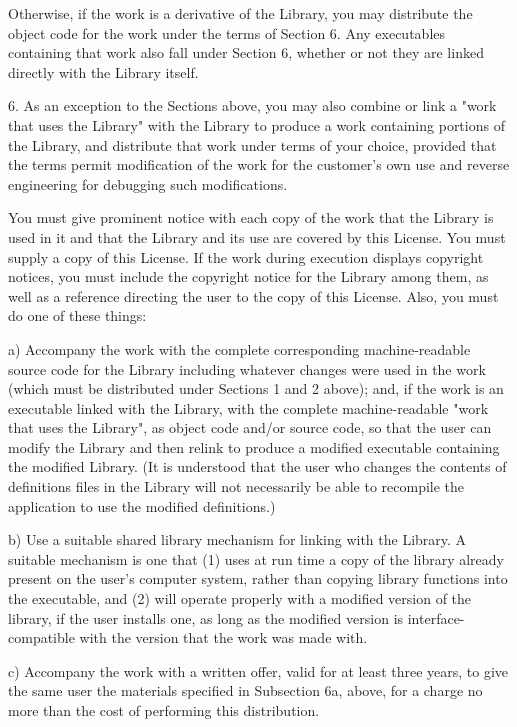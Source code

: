Otherwise, if the work is a derivative of the Library, you may distribute the object code for the work under the terms of Section 6. Any executables containing that work also fall under Section 6, whether or not they are linked directly with the Library itself.

6. As an exception to the Sections above, you may also combine or link a "work that uses the Library" with the Library to produce a work containing portions of the Library, and distribute that work under terms of your choice, provided that the terms permit modification of the work for the customer's own use and reverse engineering for debugging such modifications.

You must give prominent notice with each copy of the work that the Library is used in it and that the Library and its use are covered by this License. You must supply a copy of this License. If the work during execution displays copyright notices, you must include the copyright notice for the Library among them, as well as a reference directing the user to the copy of this License. Also, you must do one of these things:

a) Accompany the work with the complete corresponding machine-readable source code for the Library including whatever changes were used in the work (which must be distributed under Sections 1 and 2 above); and, if the work is an executable linked with the Library, with the complete machine-readable "work that uses the Library", as object code and/or source code, so that the user can modify the Library and then relink to produce a modified executable containing the modified Library. (It is understood that the user who changes the contents of definitions files in the Library will not necessarily be able to recompile the application to use the modified definitions.)

b) Use a suitable shared library mechanism for linking with the Library. A suitable mechanism is one that (1) uses at run time a copy of the library already present on the user's computer system, rather than copying library functions into the executable, and (2) will operate properly with a modified version of the library, if the user installs one, as long as the modified version is interface-compatible with the version that the work was made with.

c) Accompany the work with a written offer, valid for at least three years, to give the same user the materials specified in Subsection 6a, above, for a charge no more than the cost of performing this distribution.

